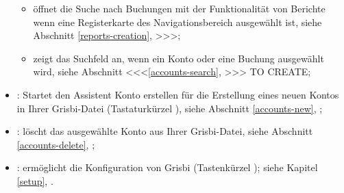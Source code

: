 \begin{itemize}
	\begin{itemize}
		\item öffnet die Suche nach Buchungen mit der Funktionalität von Berichte wenn eine Registerkarte des Navigationsbereich ausgewählt ist, siehe Abschnitt \vref{reports-creation}, >>>;%
		\item zeigt das Suchfeld an, wenn ein Konto oder eine Buchung ausgewählt wird, siehe Abschnitt <<<\vref{accounts-search}, >>> TO CREATE; %
	\end{itemize}
	
	\item {}: Startet den Assistent Konto erstellen für die Erstellung eines neuen Kontos in Ihrer Grisbi-Datei (Tastaturkürzel ), siehe Abschnitt \vref{accounts-new}, ;%
	\item {}: löscht das ausgewählte Konto aus Ihrer Grisbi-Datei, siehe Abschnitt \vref{accounts-delete}, ;%
	\item {}: ermöglicht die Konfiguration von Grisbi (Tastenkürzel ); siehe Kapitel \vref{setup}, .%
\end{itemize}


